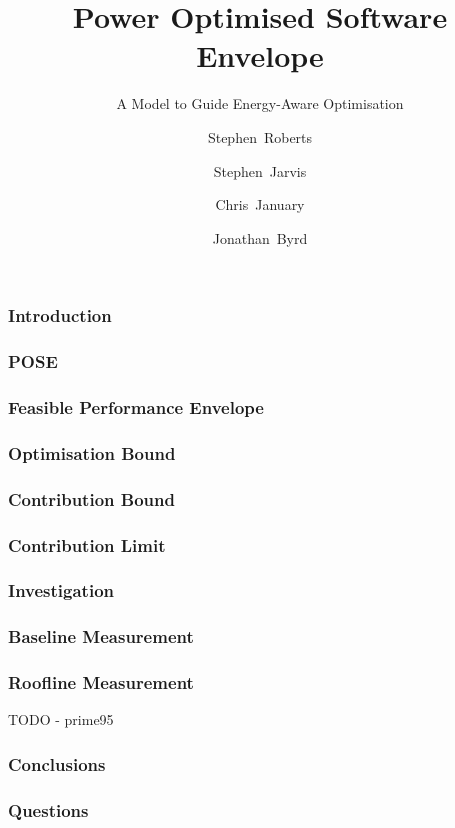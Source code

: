 \documentclass{beamer}
\title[POSE] %
{Power Optimised Software Envelope}
\subtitle{A Model to Guide Energy-Aware Optimisation}
\author[Roberts et al.] %
{Stephen~Roberts\inst{1} \and Stephen~Jarvis\inst{1} \\
 \and Chris~January\inst{1} \and Jonathan~Byrd\inst{2}}
\institute[Universities Here and There] %
{
    \inst{1}%
      Department of Computer Science\\
      The University of Warwick
    \and
      \inst{2}%
        Allinea Software
}
\begin{document}
  \frame{\titlepage}
  \begin{frame}
      \frametitle{Introduction}
  \end{frame}
  \begin{frame}
    \frametitle{POSE}
  \end{frame}
  \begin{frame}
    \frametitle{Feasible Performance Envelope}
  \end{frame}
  \begin{frame}
    \frametitle{Optimisation Bound}
  \end{frame}
  \begin{frame}
    \frametitle{Contribution Bound}
  \end{frame}
  \begin{frame}
    \frametitle{Contribution Limit}
  \end{frame}
  \begin{frame}
    \frametitle{Investigation}
  \end{frame}

\begin{frame}[fragile]
\frametitle{Baseline Measurement}
\centering                                                                      
\lstset{basicstyle=\ttfamily\footnotesize\bfseries, frame=tb} %
              
\label{fig:microbench}                                                           
\end{frame}

  \begin{frame}
    \frametitle{Roofline Measurement}
      TODO - prime95
  \end{frame}

  \begin{frame}
    \frametitle{Conclusions}
  \end{frame}
  \begin{frame}
    \frametitle{Questions}
  \end{frame}
\end{document}

